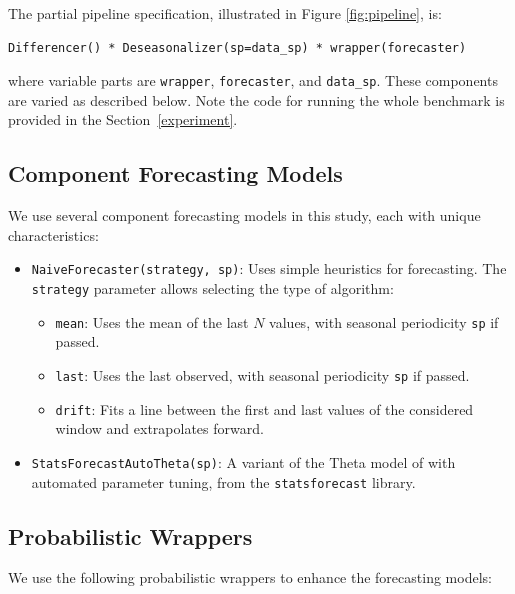 The partial pipeline specification, illustrated in Figure \ref{fig:pipeline}, is:

\begin{verbatim}
Differencer() * Deseasonalizer(sp=data_sp) * wrapper(forecaster)
\end{verbatim}

where variable parts are \texttt{wrapper}, \texttt{forecaster}, and \texttt{data\_sp}. These components are varied as described below.
Note the code for running the whole benchmark is provided in the Section~\ref{experiment}.

\subsection{Component Forecasting Models}

We use several component forecasting models in this study, each with unique characteristics:

\begin{itemize}
    \item \texttt{NaiveForecaster(strategy, sp)}: Uses simple heuristics for forecasting. The \texttt{strategy} parameter allows selecting the type of algorithm:
    \begin{itemize}
        \item \texttt{mean}: Uses the mean of the last \(N\) values, with seasonal periodicity \texttt{sp} if passed.
        \item \texttt{last}: Uses the last observed, with seasonal periodicity \texttt{sp} if passed.
        \item \texttt{drift}: Fits a line between the first and last values of the considered window and extrapolates forward.
    \end{itemize}

    \item \texttt{StatsForecastAutoTheta(sp)}: A variant of the Theta model of \cite{Assimakopoulos2000} with automated parameter tuning, from the \texttt{statsforecast} library.
    
\end{itemize}

\subsection{Probabilistic Wrappers}
We use the following probabilistic wrappers to enhance the forecasting models:

